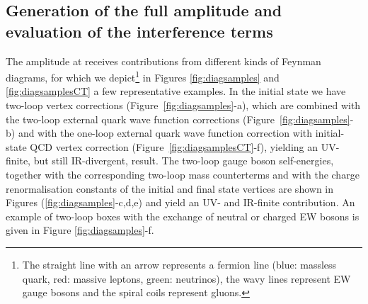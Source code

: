 \documentclass[11pt,a4paper]{article}
\begin{document}
\subsection{Generation of the full amplitude and evaluation of the interference terms}
%
The amplitude at \oaas receives contributions from different kinds of Feynman diagrams, for which
we depict\footnote{
The straight line with an arrow represents a fermion line
(blue: massless quark, red: massive leptons, green: neutrinos),
the wavy lines represent EW gauge bosons
and the spiral coils represent gluons.
}
in Figures \ref{fig:diagsamples} and \ref{fig:diagsamplesCT}
a few representative examples.
In the initial state we have
two-loop vertex corrections (Figure~\ref{fig:diagsamples}-a),
which are combined with
the two-loop external quark wave function corrections
(Figure~\ref{fig:diagsamples}-b)
and with
the one-loop external quark wave function correction
with initial-state QCD vertex correction (Figure~\ref{fig:diagsamplesCT}-f),
yielding an UV-finite, but still IR-divergent, result.
The two-loop gauge boson self-energies,
together with the corresponding two-loop mass counterterms
and with the charge renormalisation constants of the initial and final state vertices
%
are shown in Figures (\ref{fig:diagsamples}-c,d,e)
and yield an UV- and IR-finite contribution.
An example of two-loop boxes with the exchange of neutral or charged EW bosons
is given in Figure \ref{fig:diagsamples}-f.
%
%
%
\end{document}
